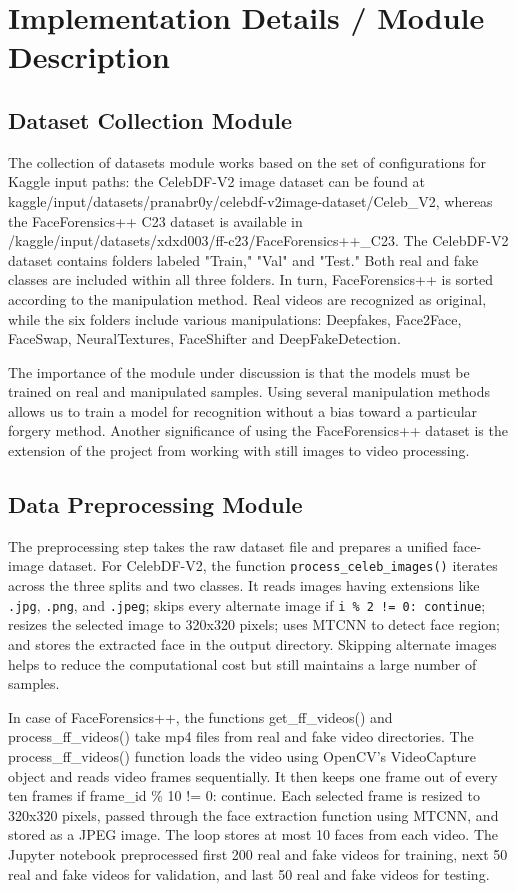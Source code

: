 \documentclass[12pt,a4paper]{report}
\begin{document}
\section{Implementation Details / Module Description}
\subsection{Dataset Collection Module}

The collection of datasets module works based on the set of configurations for Kaggle input paths: the CelebDF-V2 image dataset can be found at kaggle/input/datasets/pranabr0y/celebdf-v2image-dataset/Celeb\_V2, whereas the FaceForensics++ C23 dataset is available in /kaggle/input/datasets/xdxd003/ff-c23/FaceForensics++\_C23. The CelebDF-V2 dataset contains folders labeled "Train," "Val" and "Test." Both real and fake classes are included within all three folders. In turn, FaceForensics++ is sorted according to the manipulation method. Real videos are recognized as original, while the six folders include various manipulations: Deepfakes, Face2Face, FaceSwap, NeuralTextures, FaceShifter and DeepFakeDetection.

The importance of the module under discussion is that the models must be trained on real and manipulated samples. Using several manipulation methods allows us to train a model for recognition without a bias toward a particular forgery method. Another significance of using the FaceForensics++ dataset is the extension of the project from working with still images to video processing.

\subsection{Data Preprocessing Module}

The preprocessing step takes the raw dataset file and prepares a unified face-image dataset. For CelebDF-V2, the function \texttt{process\_celeb\_images()} iterates across the three splits and two classes. It reads images having extensions like \texttt{.jpg}, \texttt{.png}, and \texttt{.jpeg}; skips every alternate image if \texttt{i \% 2 != 0: continue}; resizes the selected image to 320x320 pixels; uses MTCNN to detect face region; and stores the extracted face in the output directory. Skipping alternate images helps to reduce the computational cost but still maintains a large number of samples.

In case of FaceForensics++, the functions get\_ff\_videos() and process\_ff\_videos() take mp4 files from real and fake video directories. The process\_ff\_videos() function loads the video using OpenCV's VideoCapture object and reads video frames sequentially. It then keeps one frame out of every ten frames if frame\_id \% 10 != 0: continue. Each selected frame is resized to 320x320 pixels, passed through the face extraction function using MTCNN, and stored as a JPEG image. The loop stores at most 10 faces from each video. The Jupyter notebook preprocessed first 200 real and fake videos for training, next 50 real and fake videos for validation, and last 50 real and fake videos for testing.
\end{document}
